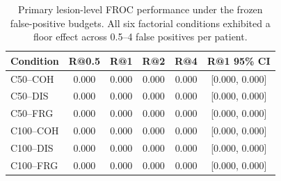 \begin{table}[t]
\centering
\small
\caption{Primary lesion-level FROC performance under the frozen false-positive budgets. All six factorial conditions exhibited a floor effect across 0.5--4 false positives per patient.}
\label{tab:cova_primary_froc}
\begin{tabular}{lccccc}
\toprule
Condition & R@0.5 & R@1 & R@2 & R@4 & R@1 95\% CI \\
\midrule
C50–COH & 0.000 & 0.000 & 0.000 & 0.000 & [0.000, 0.000] \\
C50–DIS & 0.000 & 0.000 & 0.000 & 0.000 & [0.000, 0.000] \\
C50–FRG & 0.000 & 0.000 & 0.000 & 0.000 & [0.000, 0.000] \\
C100–COH & 0.000 & 0.000 & 0.000 & 0.000 & [0.000, 0.000] \\
C100–DIS & 0.000 & 0.000 & 0.000 & 0.000 & [0.000, 0.000] \\
C100–FRG & 0.000 & 0.000 & 0.000 & 0.000 & [0.000, 0.000] \\
\bottomrule
\end{tabular}
\end{table}
